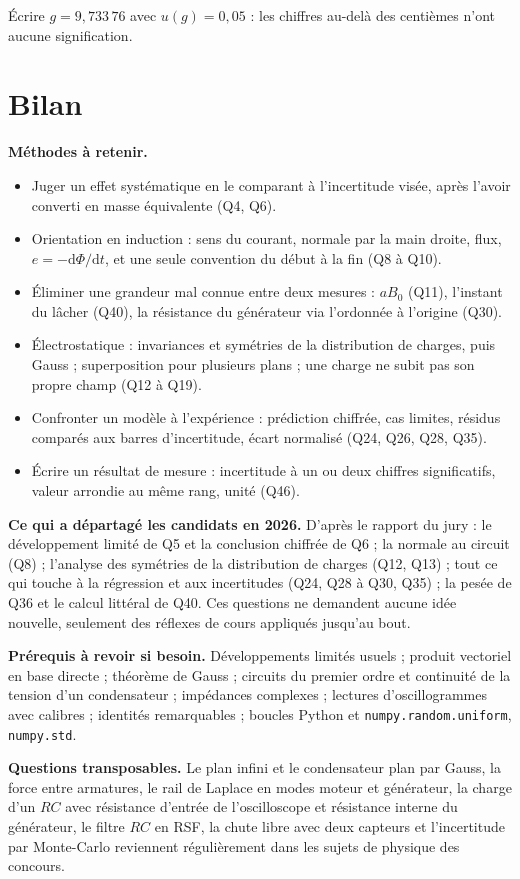 \documentclass[11pt,a4paper]{article}
\providecommand{\tightlist}{\setlength{\itemsep}{0pt}\setlength{\parskip}{0pt}}
\begin{document}
\begin{piege}

Écrire \(g=9{,}733\,76\) avec \(u(g)=0{,}05\) : les chiffres au-delà des centièmes n'ont aucune signification.

\end{piege}

\hypertarget{bilan}{%
\section{Bilan}\label{bilan}}

\textbf{Méthodes à retenir.}

\begin{itemize}
\tightlist
\item
  Juger un effet systématique en le comparant à l'incertitude visée, après l'avoir converti en masse équivalente (Q4, Q6).
\item
  Orientation en induction : sens du courant, normale par la main droite, flux, \(e=-\mathrm{d}\Phi/\mathrm{d}t\), et une seule convention du début à la fin (Q8 à Q10).
\item
  Éliminer une grandeur mal connue entre deux mesures : \(aB_0\) (Q11), l'instant du lâcher (Q40), la résistance du générateur via l'ordonnée à l'origine (Q30).
\item
  Électrostatique : invariances et symétries de la distribution de charges, puis Gauss ; superposition pour plusieurs plans ; une charge ne subit pas son propre champ (Q12 à Q19).
\item
  Confronter un modèle à l'expérience : prédiction chiffrée, cas limites, résidus comparés aux barres d'incertitude, écart normalisé (Q24, Q26, Q28, Q35).
\item
  Écrire un résultat de mesure : incertitude à un ou deux chiffres significatifs, valeur arrondie au même rang, unité (Q46).
\end{itemize}

\textbf{Ce qui a départagé les candidats en 2026.} D'après le rapport du jury : le développement limité de Q5 et la conclusion chiffrée de Q6 ; la normale au circuit (Q8) ; l'analyse des symétries de la distribution de charges (Q12, Q13) ; tout ce qui touche à la régression et aux incertitudes (Q24, Q28 à Q30, Q35) ; la pesée de Q36 et le calcul littéral de Q40. Ces questions ne demandent aucune idée nouvelle, seulement des réflexes de cours appliqués jusqu'au bout.

\textbf{Prérequis à revoir si besoin.} Développements limités usuels ; produit vectoriel en base directe ; théorème de Gauss ; circuits du premier ordre et continuité de la tension d'un condensateur ; impédances complexes ; lectures d'oscillogrammes avec calibres ; identités remarquables ; boucles Python et \texttt{numpy.random.uniform}, \texttt{numpy.std}.

\textbf{Questions transposables.} Le plan infini et le condensateur plan par Gauss, la force entre armatures, le rail de Laplace en modes moteur et générateur, la charge d'un \(RC\) avec résistance d'entrée de l'oscilloscope et résistance interne du générateur, le filtre \(RC\) en RSF, la chute libre avec deux capteurs et l'incertitude par Monte-Carlo reviennent régulièrement dans les sujets de physique des concours.
\end{document}

